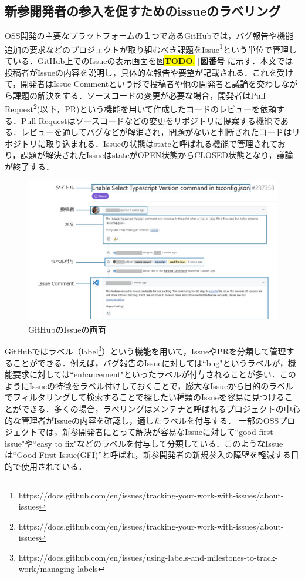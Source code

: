 \documentclass[11pt]{jreport}
\newcommand{\todo}[1]{\colorbox{yellow}{{\bf TODO}:}{\color{red} {\textbf{[#1]}}}}
\begin{document}
\subsection{新参開発者の参入を促すためのissueのラベリング}
OSS開発の主要なプラットフォームの１つであるGitHubでは，バグ報告や機能追加の要求などのプロジェクトが取り組むべき課題をIssue\footnote{https://docs.github.com/en/issues/tracking-your-work-with-issues/about-issues}という単位で管理している．GitHub上でのIssueの表示画面を図\todo{図番号}に示す．本文では投稿者がIssueの内容を説明し，具体的な報告や要望が記載される．これを受けて，開発者はIssue Commentという形で投稿者や他の開発者と議論を交わしながら課題の解決をする．ソースコードの変更が必要な場合，開発者はPull Request\footnote{https://docs.github.com/en/issues/tracking-your-work-with-issues/about-issues}(以下，PR)という機能を用いて作成したコードのレビューを依頼する．Pull Requestはソースコードなどの変更をリポジトリに提案する機能である．レビューを通してバグなどが解消され，問題がないと判断されたコードはリポジトリに取り込まれる．Issueの状態はstateと呼ばれる機能で管理されており，課題が解決されたIssueはstateがOPEN状態からCLOSED状態となり，議論が終了する．

\begin{figure}[t]
\centerline{\includegraphics[width=0.9\linewidth]{@BSthesis2024_Nakai/BSthesis2024_Nakai_fig/issue_page.jpg}}
\caption{GitHubのIssueの画面}
\label{fig:milestone}
\end{figure}

GitHubではラベル（label\footnote{https://docs.github.com/en/issues/using-labels-and-milestones-to-track-work/managing-labels}）という機能を用いて，IssueやPRを分類して管理することができる．例えば，バグ報告のIssueに対しては``bug"というラベルが，機能要求に対しては``enhancement"といったラベルが付与されることが多い．このようにIssueの特徴をラベル付けしておくことで，膨大なIssueから目的のラベルでフィルタリングして検索することで探したい種類のIssueを容易に見つけることができる．多くの場合，ラベリングはメンテナと呼ばれるプロジェクトの中心的な管理者がIssueの内容を確認し，適したラベルを付与する．
一部のOSSプロジェクトでは，新参開発者にとって解決が容易なIssueに対して``good first issue"や``easy to fix"などのラベルを付与して分類している．このようなIssueは``Good First Issue(GFI)”と呼ばれ，新参開発者の新規参入の障壁を軽減する目的で使用されている．
\end{document}
